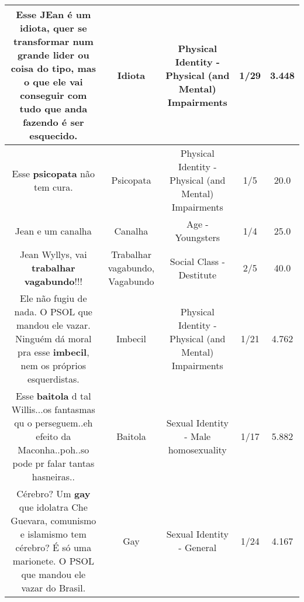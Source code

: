\documentclass[11pt]{article}
\newlength\mylength
\begin{document}
\begin{center}
\begin{longtable}{|C{.65\mylength}|C{.30\mylength}|C{.12\mylength}|C{.12\mylength}|C{.12\mylength}|}
  \small Esse JEan é um \textbf{idiota}, quer se transformar num grande lider ou coisa do tipo, mas o que ele vai conseguir com tudo que anda fazendo é ser esquecido.\normalsize   & Idiota & Physical Identity - Physical (and Mental) Impairments & 1/29 & 3.448 \\  \hline
  \small Esse \textbf{psicopata} não tem cura.\normalsize   & Psicopata & Physical Identity - Physical (and Mental) Impairments & 1/5 & 20.0 \\  \hline
  \small Jean e um canalha\normalsize   & Canalha & Age - Youngsters & 1/4 & 25.0 \\  \hline
  \small Jean Wyllys, vai \textbf{trabalhar v\textbf{agabundo}}!!!\normalsize   & Trabalhar vagabundo, Vagabundo & Social Class - Destitute & 2/5 & 40.0 \\  \hline
  \small Ele não fugiu de nada. O PSOL que mandou ele vazar. Ninguém dá moral pra esse \textbf{imbecil}, nem os próprios esquerdistas.\normalsize   & Imbecil & Physical Identity - Physical (and Mental) Impairments & 1/21 & 4.762 \\  \hline
  \small Esse \textbf{baitola} d tal Willis...os fantasmas qu o  perseguem..eh efeito  da Maconha..poh..so pode  pr falar tantas  hasneiras..\normalsize   & Baitola & Sexual Identity - Male homosexuality & 1/17 & 5.882 \\  \hline
  \small Cérebro? Um \textbf{gay} que idolatra Che Guevara, comunismo e islamismo tem cérebro? É só uma marionete. O PSOL que mandou ele vazar do Brasil.\normalsize   & Gay & Sexual Identity - General & 1/24 & 4.167 \\  \hline
  
\end{longtable}
\end{center}
\end{document}

